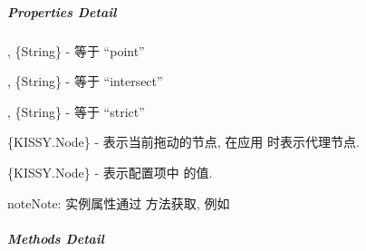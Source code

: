 \documentclass[letterpaper,10pt,english]{sphinxmanual}
\begin{document}
\subparagraph{Properties Detail}
\label{api/component/dd/draggable:properties-detail}

\begin{fulllineitems}
\label{api/component/dd/draggable:Draggable.POINT}
, \{String\} - 等于 ``point''

\end{fulllineitems}



\begin{fulllineitems}
\label{api/component/dd/draggable:Draggable.INTERSECT}
, \{String\} - 等于 ``intersect''

\end{fulllineitems}



\begin{fulllineitems}
\label{api/component/dd/draggable:Draggable.STRICT}
, \{String\} - 等于 ``strict''

\end{fulllineitems}



\begin{fulllineitems}
\{KISSY.Node\} - 表示当前拖动的节点, 在应用  时表示代理节点.

\end{fulllineitems}



\begin{fulllineitems}
\label{api/component/dd/draggable:Draggable.dragNode}
\{KISSY.Node\} - 表示配置项中  {\hyperref[api/component/dd/draggable:Draggable.node]{}} 的值.

\begin{notice}{note}{Note:}
实例属性通过  方法获取, 例如 
\end{notice}

\end{fulllineitems}



\subparagraph{Methods Detail}
\label{api/component/dd/draggable:methods-detail}
\end{document}
